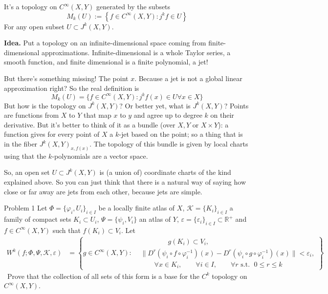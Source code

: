 \vspace{1em}
\iffalse
\begin{defn}[\(C^k\) topology]\leavevmode
It's a topology on \(C^\infty (X,Y)\) generated by the subsets
\[M_k(U):=\left\{ f \in C^\infty(X,Y) : j^kf \in U  \right\}\]
For any open subset \(U \subset J^k(X,Y)\).

\textbf{Idea.} Put a topology on an infinite-dimensional space coming from finite-dimensional approximations. Infinite-dimensional is a whole Taylor series, a smooth function, and finite dimensional is a finite polynomial, a jet!

But there's something missing! The point \(x\). Because a jet is not a global linear approximation right? So the real definition is
\[M_k(U)=\{f \in C^\infty (X,Y): j^kf(x) \in U \forall x \in X\}\]
But how is the topology on \(J^k(X,Y)\)? Or better yet, what is \(J^k(X,Y)\)? Points are functions from \(X\) to \(Y\) that map \(x\) to \(y\) and agree up to degree \(k\) on their derivative. But it's better to think of it as a bundle (over \(X, Y\) or \(X \times Y\)):  a function gives for every point of \(X\) a \(k\)-jet based on the point; so a thing that is in the fiber \(J^k(X,Y)_{x,f(x)}\). The topology of this bundle is given by local charts using that the \(k\)-polynomials are a vector space.

So, an open set \(U \subset J^k(X,Y)\) is (a union of) coordinate charts of the kind explained above. So you can just think that there is a natural way of saying how close or far away are jets from each other, because jets are simple.
\end{defn}
\begin{thing1}{Problem 1}\label{p:1}\leavevmode
Let  \(\Phi=\{\varphi_i,U_i\}_{i \in I}\) be a locally finite atlas of \(X\), \(\mathcal{K}=\{K_i\}_{i \in I}\) a family of compact sets \(K_i \subset U_i\), \(\Psi=\{\psi_i,V_i\}\) an atlas of \(Y\), \(\varepsilon=\{\varepsilon_i\}_{i \in I}\subset \mathbb{R}^+\) and \(f\in C^\infty(X,Y)\) such that \(f (K_i) \subset V_i\). Let
\begin{align*}
W^k(f;\Phi,\Psi,\mathcal{K},\varepsilon)&=\left\{ g \in C^\infty(X,Y)  :\begin{aligned}
&\qquad  \qquad g(K_i)\subset V_i,\\& \|D^r(\psi_i \circ f \circ \varphi_i^{-1})(x)-D^r(\psi_i \circ g \circ \varphi_i^{-1})(x)\|<\varepsilon_i,\\
&\qquad \forall x \in K_i,\qquad \forall i \in I, \qquad \forall r\text{ s.t. } \; 0 \leq r\leq k
\end{aligned}\right\}
\end{align*}\
Prove that the collection of all sets of this form is a base for the \(C^k\) topology on \(C^\infty(X,Y)\).
\end{thing1}

